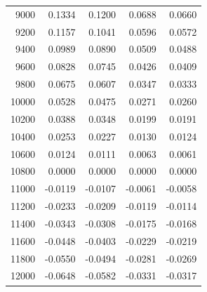 \begin{tabular}{rrrrr}
9000 & 0.1334 & 0.1200 & 0.0688 & 0.0660 \\
9200 & 0.1157 & 0.1041 & 0.0596 & 0.0572 \\
9400 & 0.0989 & 0.0890 & 0.0509 & 0.0488 \\
9600 & 0.0828 & 0.0745 & 0.0426 & 0.0409 \\
9800 & 0.0675 & 0.0607 & 0.0347 & 0.0333 \\
10000 & 0.0528 & 0.0475 & 0.0271 & 0.0260 \\
10200 & 0.0388 & 0.0348 & 0.0199 & 0.0191 \\
10400 & 0.0253 & 0.0227 & 0.0130 & 0.0124 \\
10600 & 0.0124 & 0.0111 & 0.0063 & 0.0061 \\
10800 & 0.0000 & 0.0000 & 0.0000 & 0.0000 \\
11000 & -0.0119 & -0.0107 & -0.0061 & -0.0058 \\
11200 & -0.0233 & -0.0209 & -0.0119 & -0.0114 \\
11400 & -0.0343 & -0.0308 & -0.0175 & -0.0168 \\
11600 & -0.0448 & -0.0403 & -0.0229 & -0.0219 \\
11800 & -0.0550 & -0.0494 & -0.0281 & -0.0269 \\
12000 & -0.0648 & -0.0582 & -0.0331 & -0.0317 \\
\bottomrule
\end{tabular}
